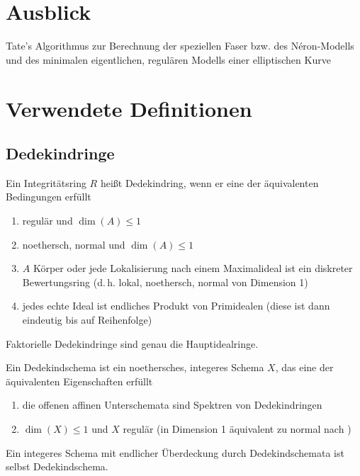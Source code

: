 \documentclass[german]{scrreprt}
\begin{document}
\chapter{Ausblick}
Tate's Algorithmus zur Berechnung der speziellen Faser bzw. des
Néron-Modells und des minimalen eigentlichen, regulären Modells einer
elliptischen Kurve
\cite[IV.9]{silverman2}

\appendix
\chapter{Verwendete Definitionen}
\section{Dedekindringe}
\begin{Definition}[Dedekindring]\label{def:dedekindring}
  Ein Integritätsring $R$ heißt Dedekindring, wenn er eine der
  äquivalenten Bedingungen erfüllt
  \begin{enumerate}[label=(\roman*)]
  \item regulär und $\dim(A)\leq 1$
  \item noethersch, normal und $\dim(A)\leq 1$
  \item $A$ Körper oder
    jede Lokalisierung nach einem Maximalideal ist ein diskreter
    Bewertungsring
    (d.\,h. lokal, noethersch, normal von Dimension 1)
  \item jedes echte Ideal ist endliches Produkt von Primidealen
    (diese ist dann eindeutig bis auf Reihenfolge) 
  \end{enumerate}

  Faktorielle Dedekindringe sind genau die Hauptidealringe.

  \begin{Definition}[Dedekindschema]
    Ein Dedekindschema ist ein noethersches, integeres Schema $X$, das
    eine der äquivalenten Eigenschaften erfüllt
    \begin{enumerate}[label=(\roman*)]
    \item die offenen affinen Unterschemata sind Spektren von Dedekindringen
    \item $\dim(X)\leq 1$ und $X$ regulär
      (in Dimension 1 äquivalent zu normal nach
      \cite[Corollary 6.39, Proposition 6.40]{wedhorn})
    \end{enumerate}
    Ein integeres Schema mit endlicher Überdeckung durch Dedekindschemata
    ist selbst Dedekindschema.
  \end{Definition}


\end{Definition}
\end{document}
